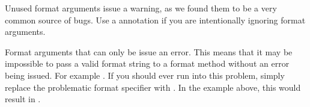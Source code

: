 Unused format arguments issue a warning, as we found them to be a very common source of bugs.
Use a  annotation if you are intentionally ignoring format arguments.

Format arguments that can only be  issue an error. This means that it
may be impossible to pass a valid format string to a format method without an
error being issued. For example . 
If you should ever run into this problem, simply replace the problematic format 
specifier with . In the example above, this would result in
.


% 
% 
% 
% 
